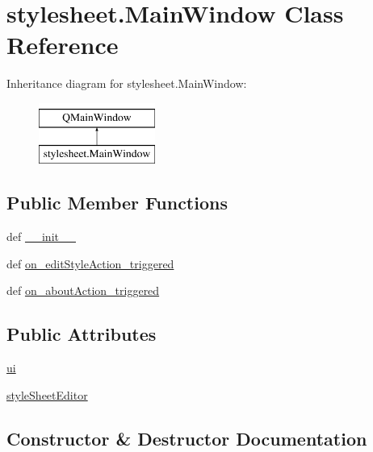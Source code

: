 \hypertarget{classstylesheet_1_1MainWindow}{}\section{stylesheet.\+Main\+Window Class Reference}
\label{classstylesheet_1_1MainWindow}
Inheritance diagram for stylesheet.\+Main\+Window\+:\begin{figure}[H]
\begin{center}
\leavevmode
\includegraphics[height=2.000000cm]{classstylesheet_1_1MainWindow}
\end{center}
\end{figure}
\subsection*{Public Member Functions}
\begin{DoxyCompactItemize}
\item 
def \hyperlink{classstylesheet_1_1MainWindow_a01df831c7adcc162ca7539af0fb37e85}{\+\_\+\+\_\+init\+\_\+\+\_\+}
\item 
def \hyperlink{classstylesheet_1_1MainWindow_a3abe40146c0dc97d636b944d0d547bd5}{on\+\_\+edit\+Style\+Action\+\_\+triggered}
\item 
def \hyperlink{classstylesheet_1_1MainWindow_ab1c484fb57b33ef9a66768b1404bcbd6}{on\+\_\+about\+Action\+\_\+triggered}
\end{DoxyCompactItemize}
\subsection*{Public Attributes}
\begin{DoxyCompactItemize}
\item 
\hyperlink{classstylesheet_1_1MainWindow_af36f1a1e1ebdbd23cf238df8169c7a3b}{ui}
\item 
\hyperlink{classstylesheet_1_1MainWindow_a7f6014dd47934a5b6118e953f26a6ead}{style\+Sheet\+Editor}
\end{DoxyCompactItemize}


\subsection{Constructor \& Destructor Documentation}
\hypertarget{classstylesheet_1_1MainWindow_a01df831c7adcc162ca7539af0fb37e85}{}
